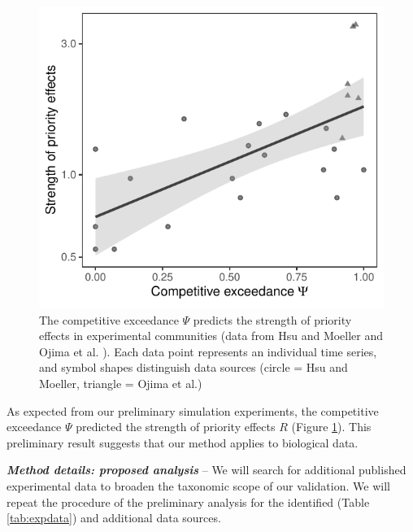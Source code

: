 \documentclass[12pt, class=article, crop=false]{standalone}
\begin{document}
\begin{figure}
    \includegraphics[scale=0.6]{output/figure_exp.pdf}
    \caption{The competitive exceedance $\Psi$ predicts the strength of priority effects in experimental communities (data from Hsu and Moeller \citep{hsu_metabolic_2021} and Ojima et al. \citep{ojima_priority_2022}).
    Each data point represents an individual time series, and symbol shapes distinguish data sources (circle = Hsu and Moeller, triangle = Ojima et al.)}
    \label{fig:experiment}
\end{figure}

As expected from our preliminary simulation experiments, the competitive exceedance $\Psi$ predicted the strength of priority effects $R$ (Figure \ref{fig:experiment}).
This preliminary result suggests that our method applies to biological data.

\textit{\textbf{Method details: proposed analysis}} --
We will search for additional published experimental data to broaden the taxonomic scope of our validation.
We will repeat the procedure of the preliminary analysis for the identified (Table \ref{tab:expdata}) and additional data sources.
\end{document}
